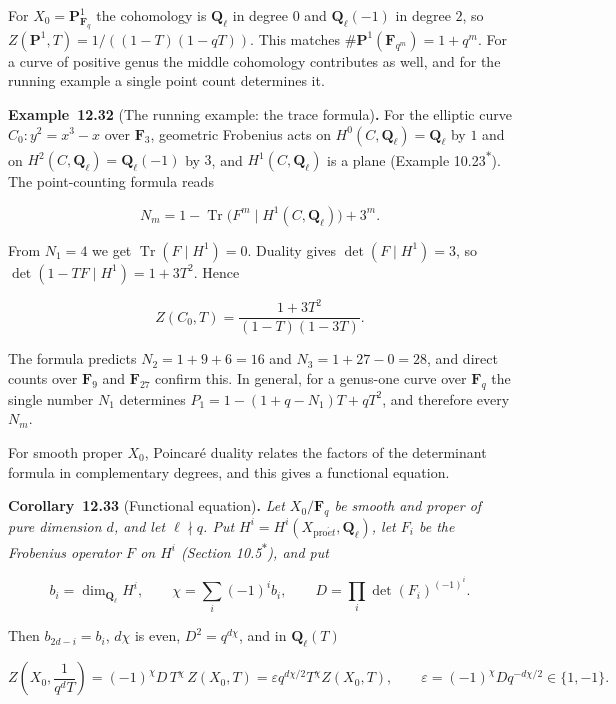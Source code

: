 \documentclass[11pt]{article}
\newenvironment{bpstatement}[2]{\par\addvspace{0.6\baselineskip}\noindent\textbf{#1}#2\textbf{.}\enspace\ignorespaces}
  {\par\addvspace{0.4\baselineskip}}
\newenvironment{bpstatementit}[2]{\begin{bpstatement}{#1}{#2}\itshape\ignorespaces}{\end{bpstatement}}
\newcommand{\bpout}[1]{#1\textsuperscript{\hyperlink{bp-outside}{\ensuremath{\ast}}}}
\begin{document}
For \(X_0=\mathbf P^1_{\mathbf F_q}\) the cohomology is \(\mathbf Q_\ell\) in degree \(0\) and \(\mathbf Q_\ell(-1)\) in degree \(2\), so \(Z(\mathbf P^1,T)=1/((1-T)(1-qT))\). This matches \(\#\mathbf P^1(\mathbf F_{q^m})=1+q^m\). For a curve of positive genus the middle cohomology contributes as well, and for the running example a single point count determines it.

\label{bp98}%
\begin{bpstatement}{Example~12.32}{ (The running example: the trace formula)}
For the elliptic curve \(C_0\colon y^2=x^3-x\) over \(\mathbf F_3\), geometric Frobenius acts on \(H^0(C,\mathbf Q_\ell)=\mathbf Q_\ell\) by \(1\) and on \(H^2(C,\mathbf Q_\ell)=\mathbf Q_\ell(-1)\) by \(3\), and \(H^1(C,\mathbf Q_\ell)\) is a plane (Example \bpout{10.23}). The point-counting formula reads

\[
N_m=1-\operatorname{Tr}\bigl(F^m\mid H^1(C,\mathbf Q_\ell)\bigr)+3^m .
\]

From \(N_1=4\) we get \(\operatorname{Tr}(F\mid H^1)=0\). Duality gives \(\det(F\mid H^1)=3\), so \(\det(1-TF\mid H^1)=1+3T^2\). Hence

\[
Z(C_0,T)=\frac{1+3T^2}{(1-T)(1-3T)}.
\]

The formula predicts \(N_2=1+9+6=16\) and \(N_3=1+27-0=28\), and direct counts over \(\mathbf F_9\) and \(\mathbf F_{27}\) confirm this. In general, for a genus-one curve over \(\mathbf F_q\) the single number \(N_1\) determines \(P_1=1-(1+q-N_1)T+qT^2\), and therefore every \(N_m\).
\end{bpstatement}

\label{bp99}%
For smooth proper \(X_0\), Poincaré duality relates the factors of the determinant formula in complementary degrees, and this gives a functional equation.

\label{bp100}%
\begin{bpstatementit}{Corollary~12.33}{ (Functional equation)}
Let \(X_0/\mathbf F_q\) be smooth and proper of pure dimension \(d\), and let \(\ell\nmid q\). Put \(H^i=H^i(X_{\mathrm{pro}\acute{e}t},\mathbf Q_\ell)\), let \(F_i\) be the Frobenius operator \(F\) on \(H^i\) (Section \bpout{10.5}), and put

\[
b_i=\dim_{\mathbf Q_\ell}H^i,\qquad \chi=\sum_i(-1)^ib_i,\qquad
D=\prod_i\det(F_i)^{(-1)^i}.
\]

Then \(b_{2d-i}=b_i\), \(d\chi\) is even, \(D^2=q^{d\chi}\), and in \(\mathbf Q_\ell(T)\)

\[
Z\!\left(X_0,\frac1{q^dT}\right)=(-1)^{\chi}D\,T^{\chi}\,Z(X_0,T)
=\varepsilon q^{d\chi/2}T^{\chi}Z(X_0,T),
\qquad \varepsilon=(-1)^\chi Dq^{-d\chi/2}\in\{1,-1\}.
\]
\end{bpstatementit}
\end{document}
